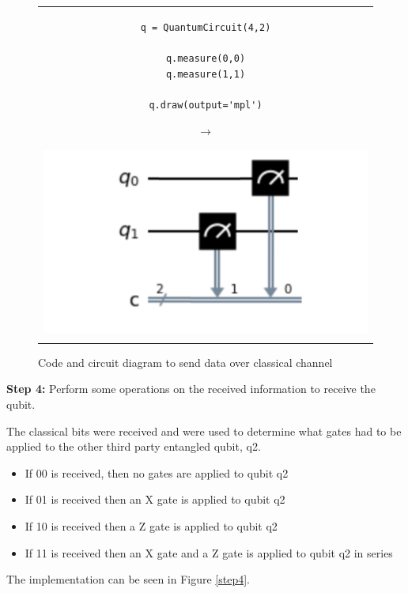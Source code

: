 \begin{figure}[H]
\centering
\begin{tabular}{c}
\begin{minipage}[c]{.45\linewidth}
\begin{verbatim}
q = QuantumCircuit(4,2)

q.measure(0,0)
q.measure(1,1)

q.draw(output='mpl')
\end{verbatim}
\end{minipage}
\begin{minipage}[c]{.1\linewidth}
\centering
$\rightarrow$
\end{minipage}
\begin{minipage}[c]{.4\linewidth}
\centering
\includegraphics[width=\textwidth]{lab3/images/Step3.png}
\end{minipage}\\
\\ 
\end{tabular}
\caption{Code and circuit diagram to send data over classical channel}
\label{step3}
\end{figure}

\textbf{Step 4:} Perform some operations on the received information to receive the qubit.

The classical bits were received and were used to determine what gates had to be applied to the other third party entangled qubit, q2. 
\begin{itemize}
    \item If 00 is received, then no gates are applied to qubit q2
    \item If 01 is received then an X gate is applied to qubit q2
    \item If 10 is received then a Z gate is applied to qubit q2
    \item If 11 is received then an X gate and a Z gate is applied to qubit q2 in series
\end{itemize}
The implementation can be seen in Figure \ref{step4}.

